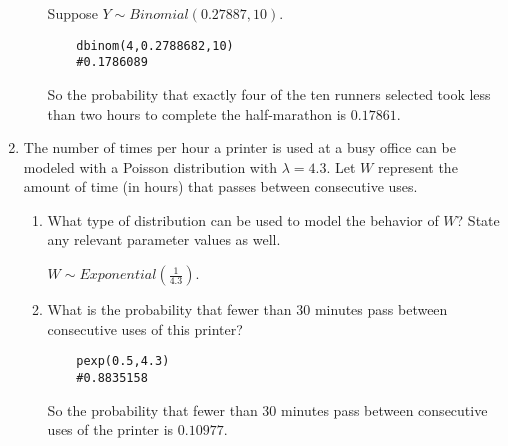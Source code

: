 \documentclass[]{article}
\begin{document}
\begin{enumerate}
\begin{enumerate}[label= (\alph*)]
Suppose $Y\sim Binomial(0.27887,10)$.

\begin{verbatim}
    dbinom(4,0.2788682,10)
    #0.1786089
\end{verbatim}

So the probability that exactly four of the ten runners selected took less than two hours to complete the half-marathon is $0.17861$.

\end{enumerate}
\item The number of times per hour a printer is used at a busy office can be modeled with a
Poisson distribution with $\lambda = 4.3$. Let $W$ represent the amount of time (in hours) that
passes between consecutive uses.
\begin{enumerate}[label= (\alph*)] 
\item What type of distribution can be used to model the behavior of $W$? State any
relevant parameter values as well.

$W\sim Exponential\left(\frac{1}{4.3}\right)$.

\item What is the probability that fewer than 30 minutes pass between consecutive uses
of this printer?
\begin{verbatim}
    pexp(0.5,4.3)
    #0.8835158
\end{verbatim}
So the probability that fewer than 30 minutes pass between consecutive uses of the printer is $0.10977$.
\end{enumerate}
\end{enumerate}
\end{document}
